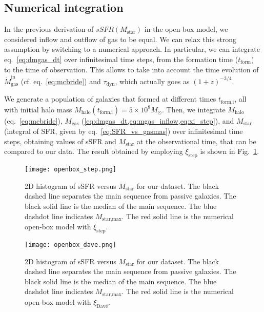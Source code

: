 \documentclass[fleqn,usenatbib]{mnras}
\begin{document}
\subsection{Numerical integration}\label{sec:numerical_integration}
In the previous derivation of $sSFR\left(M_{\text{star}}\right)$ in the open-box model, we considered inflow and outflow of gas to be equal. We can relax this strong assumption by switching to a numerical approach. In particular, we can integrate eq.~\ref{eq:dmgas_dt} over infinitesimal time steps, from the formation time ($t_\text{form}$) to the time of observation. This allows to take into account the time evolution of $\dot{M}_\text{gas}^\text{in}$ (cf. eq.~\ref{eq:mcbride}) and $\tau_\text{dyn}$, which actually goes as {\small$(1+z)^{-3/4}$}. 

We generate a population of galaxies that formed at different times $t_\text{form,i}$, all with initial halo mass $M_\text{halo}(t_\text{form,i})=5 \times 10^8 M_\odot$. Then, we integrate $M_\text{halo}$ (eq.~\ref{eq:mcbride}), $M_\text{gas}$ (\cref{eq:dmgas_dt,eq:mgas_inflow,eq:xi_step}), and $M_\text{star}$ (integral of SFR, given by eq.~\ref{eq:SFR_vs_gasmas}) over infinitesimal time steps, obtaining values of sSFR and $M_\text{star}$ at the observational time, that can be compared to our data. The result obtained by employing $\xi_\text{step}$ is shown in Fig.~\ref{fig:openbox_step}.

\begin{figure}\centering
	\texttt{[image: openbox\_step.png]}
    \caption{2D histogram of sSFR versus $M_{\text{star}}$ for our dataset. The black dashed line separates the main sequence from passive galaxies. The black solid line is the median of the main sequence. The blue dashdot line indicates $M_{\text{star,max}}$. The red solid line is the numerical open-box model with $\xi_\text{step}$.}
    \label{fig:openbox_step}
\end{figure}

\begin{figure}\centering
	\texttt{[image: openbox\_dave.png]}
    \caption{2D histogram of sSFR versus $M_{\text{star}}$ for our dataset. The black dashed line separates the main sequence from passive galaxies. The black solid line is the median of the main sequence. The blue dashdot line indicates $M_{\text{star,max}}$. The red solid line is the numerical open-box model with $\xi_\text{Davé}$.}
    \label{fig:openbox_dave}
\end{figure}
\end{document}
